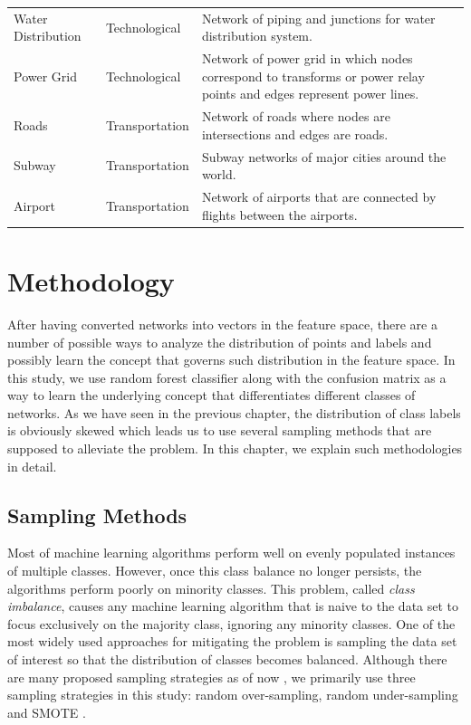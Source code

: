 \documentclass[..]{revtex4}
\begin{document}
\begin{longtable}{| l | l | p{9cm} |}
      Water Distribution &  Technological & Network of piping and junctions for water distribution system.\\ %
      Power Grid &  Technological & Network of power grid in which nodes correspond to transforms or power relay points and edges represent power lines.\\ %
      Roads &  Transportation & Network of roads where nodes are intersections and edges are roads.\\ %
      Subway &  Transportation & Subway networks of major cities around the world.\\ %
      Airport &  Transportation & Network of airports that are connected by flights between the airports.\\  \hline
           
\end{longtable}


\newpage
\section{Methodology}
After having converted networks into vectors in the feature space, there are a number of possible ways to analyze the distribution of points and labels and possibly learn the concept that governs such distribution in the feature space. In this study, we use random forest classifier along with the confusion matrix as a way to learn the underlying concept that differentiates different classes of networks. As we have seen in the previous chapter, the distribution of class labels is obviously skewed which leads us to use several sampling methods that are supposed to alleviate the problem. In this chapter, we explain such methodologies in detail.

	\subsection{Sampling Methods}
Most of machine learning algorithms perform well on evenly populated instances of multiple classes. However, once this class balance no longer persists, the algorithms perform poorly on minority classes. This problem, called \textit{class imbalance}, causes any machine learning algorithm that is naive to the data set to focus exclusively on the majority class, ignoring any minority classes. One of the most widely used approaches for mitigating the problem is sampling the data set of interest so that the distribution of classes becomes balanced. Although there are many proposed sampling strategies as of now \cite{SurveySampling}, we primarily use three sampling strategies in this study: random over-sampling, random under-sampling and SMOTE \cite{SMOTE}.
\end{document}
